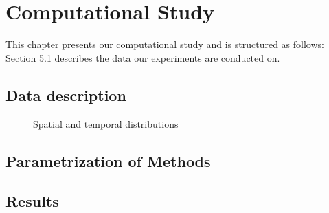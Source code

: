 \chapter{Computational Study}

This chapter presents our computational study and is structured as follows: Section 5.1 describes the data our experiments are conducted on.  
\section{Data description}



\begin{figure}[h]
	\centering
	\caption{Spatial and temporal distributions}
	\label{fig:spatial_dist}
\end{figure}

\section{Parametrization of Methods}

\section{Results}







